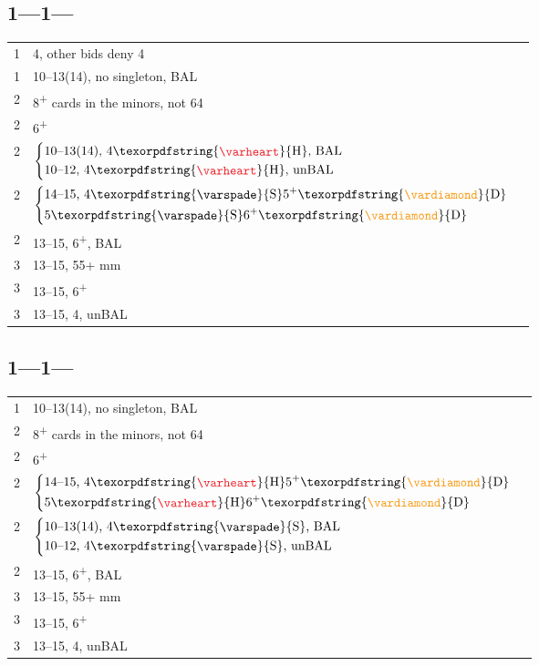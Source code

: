 \documentclass[11pt]{article}
\renewcommand{\C}{\texorpdfstring{\textcolor{ForestGreen}{\raisebox{-0.017em}{\ensuremath{\varclub}}}}{C}}
\newcommand{\D}{\texorpdfstring{\textcolor{YellowOrange}{\raisebox{-0.35pt}{\ensuremath{\vardiamond}}}}{D}}
\renewcommand{\H}{\texorpdfstring{\textcolor{Red}{\raisebox{-0.06em}{\ensuremath{\varheart}}}}{H}}
\renewcommand{\S}{\texorpdfstring{\raisebox{-0.03em}{\ensuremath{\varspade}}}{S}}
\newcommand{\N}{\texorpdfstring{\textcolor{Cerulean}{\raisebox{0.15em}{\scalebox{0.72}{\ensuremath{\bigodot}}}}}{NT}}
\newcommand{\+}{\textsuperscript{+}}
\newenvironment{bidtable}{%
	\begin{tabular}{l l}%
}{%
	\end{tabular}%
}
\begin{document}
\subsection[1\D--1\H]{1\D---1\H---} \label{1D1H}

\begin{bidtable}
    1\S & 4\S, other bids deny 4\S \\
    1\N & 10--13(14), no singleton, BAL \\
    2\C & 8\+ cards in the minors, not 6\D 4\C \\
    2\D & 6\+\D \\
    2\H & $\begin{dcases}
        \text{10--13(14), 4\H, BAL} & \\
        \text{10--12, 4\H, unBAL} & \\
    \end{dcases}$ \\
    2\S & $\begin{dcases}
        \text{14--15, 4\S 5\+\D} & \\
        \text{5\S 6\+\D} & \\
    \end{dcases}$ \\
    2\N & 13--15, 6\+\D, BAL \\
    3\C & 13--15, 55+ mm \\
    3\D & 13--15, 6\+\D \\
    3\H & 13--15, 4\H, unBAL
\end{bidtable}

\subsection[1\D--1\S]{1\D---1\S---} \label{1D1S}

\begin{bidtable}
    1\N & 10--13(14), no singleton, BAL \\
    2\C & 8\+ cards in the minors, not 6\D 4\C \\
    2\D & 6\+\D \\
    2\H & $\begin{dcases}
        \text{14--15, 4\H 5\+\D} & \\
        \text{5\H 6\+\D} & \\
    \end{dcases}$ \\
    2\S & $\begin{dcases}
        \text{10--13(14), 4\S, BAL} & \\
        \text{10--12, 4\S, unBAL} & \\
    \end{dcases}$ \\
    2\N & 13--15, 6\+\D, BAL \\
    3\C & 13--15, 55+ mm \\
    3\D & 13--15, 6\+\D \\
    3\S & 13--15, 4\S, unBAL \\
\end{bidtable}
\end{document}
